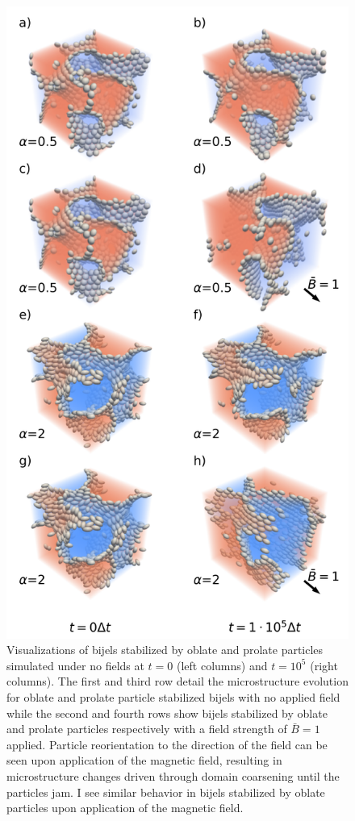 \begin{figure} 
\centering 
\includegraphics[scale=0.4]{../figures/results/paper2/microstructure_viz-field_on.png} 
\caption{Visualizations of bijels stabilized by oblate and prolate particles simulated under no fields at $t = 0$ (left columns) and $t = 10^5$ (right columns). The first 
         and third row detail the microstructure evolution for oblate and prolate particle stabilized bijels with no applied field while the second and fourth rows show 
         bijels stabilized by oblate and prolate particles respectively with a field strength of $\bar{B} = 1$ applied. Particle reorientation to the direction of the 
         field can be seen upon application of the magnetic field, resulting in microstructure changes driven through domain coarsening until the particles jam. I see 
         similar behavior in bijels stabilized by oblate particles upon application of the magnetic field.}
\label{fig:microstructure_viz-field_on} 
\end{figure}

